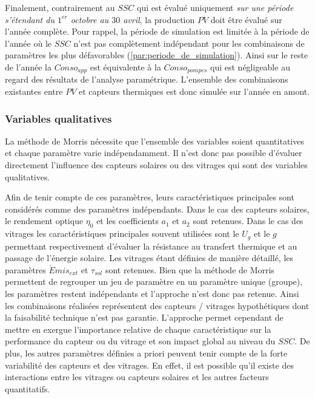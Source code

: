 Finalement, contrairement au $SSC$ qui est évalué uniquement \emph{sur une période
s’étendant du $1^{er}$ octobre au $30$ avril}, la production $PV$ doit être évalué sur
l’année complète. Pour rappel, la période de simulation est limitée à la période de
l’année où le $SSC$ n’est pas complètement indépendant pour les combinaisons de paramètres
les plus défavorables (\ref{par:periode_de_simulation}). Ainsi sur le reste de l’année la
$Conso_{app}$ est équivalente à la $Conso_{pompes}$ qui est négligeable au regard des
résultats de l’analyse paramétrique. L’ensemble des combinaisons existantes entre $PV$ et
capteurs thermiques est donc simulée sur l’année en amont.


\subsubsection{Variables qualitatives} %
\label{ssub:variables_qualitatives}
La méthode de Morris nécessite que l’ensemble des variables soient quantitatives et chaque
paramètre varie indépendamment. Il n’est donc pas possible d’évaluer directement
l’influence des capteurs solaires ou des vitrages qui sont des variables qualitatives.

Afin de tenir compte de ces paramètres, leurs caractéristiques principales sont considérés
comme des paramètres indépendants. Dans le cas des capteurs solaires, le rendement optique
$\eta_{0}$ et les coefficients $a_{1}$ et $a_{2}$ sont retenues. Dans le cas des vitrages
les caractéristiques principales souvent utilisées sont le $U_{g}$ et le $g$ permettant
respectivement d’évaluer la résistance au transfert thermique et au passage de l’énergie
solaire. Les vitrages étant définies de manière détaillé, les paramètres $\acute
Emis_{ext}$ et $\tau_{sol}$ sont retenues. Bien que la méthode de Morris permettent de
regrouper un jeu de paramètre en un paramètre unique (groupe), les paramètres restent
indépendants et l’approche n’est donc pas retenue. Ainsi les combinaisons réalisées
représentent des capteurs / vitrages hypothétiques dont la faisabilité technique n’est pas
garantie. L’approche permet cependant de mettre en exergue l’importance relative de chaque
caractéristique sur la performance du capteur ou du vitrage et son impact global au niveau
du $SSC$. De plus, les autres paramètres définies a priori peuvent tenir compte de la
forte variabilité des capteurs et des vitrages. En effet, il est possible qu’il existe des
interactions entre les vitrages ou capteurs solaires et les autres facteurs quantitatifs.

